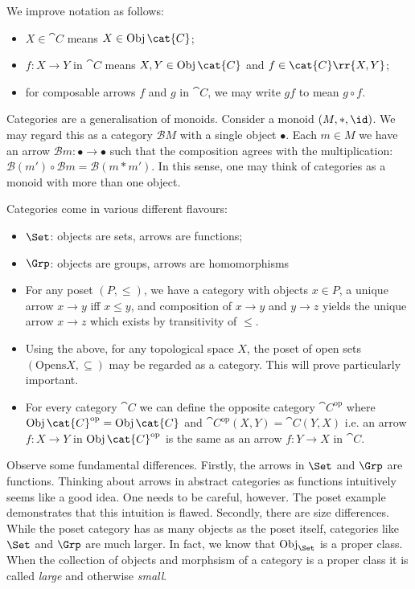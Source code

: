 \documentclass{article}
\begin{document}
\begin{notation}
  We improve notation as follows:
  \begin{itemize}
    \item $X\in\cat{C}$ means $X\in\Obj\cat{C}$;
    \item $f:X\to Y$ in $\cat{C}$ means $X,Y\in\Obj\cat{C}$ and $f\in\cat{C}\rr{X,Y}$;
    \item for composable arrows $f$ and $g$ in $\cat{C}$, we may write $gf$ to mean $g\circ f$.
  \end{itemize}
\end{notation}

Categories are a generalisation of monoids. Consider a monoid $(M,*,\id)$. We
may regard this as a category $\mathcal B M$ with a single object $\bullet$.
Each $m\in M$ we have an arrow $\mathcal B m:\bullet\to\bullet$ such that the
composition agrees with the multiplication: $\mathcal B(m')\circ\mathcal Bm =
\mathcal B(m * m')$. In this sense, one may think of categories as a monoid
with more than one object.

\begin{example}
  Categories come in various different flavours:
  \begin{itemize}
    \item $\Set$: objects are sets, arrows are functions;
    \item $\Grp$: objects are groups, arrows are homomorphisms
    \item For any poset $(P,\leq)$, we have a category with objects $x\in P$,
      a unique arrow $x\to y$ iff $x\leq y$, and composition of $x\to y$ and
      $y\to z$ yields the unique arrow $x\to z$ which exists by transitivity
      of $\leq$.
    \item Using the above, for any topological space $X$, the poset of open sets
      $(\text{Opens}X, \subseteq)$ may be regarded as a category. This will prove
      particularly important.
    \item For every category $\cat{C}$ we can define the opposite category $\cat{C}^{\text{op}}$
      where $\Obj {\cat{C}^{\text{op}}} = \Obj {\cat{C}}$ and
      $\cat{C}^{\text{op}}(X, Y) = \cat{C}(Y,X)$ i.e. an arrow $f: X \to Y$
      in $\Obj {\cat{C}^{\text{op}}}$ is the same as an arrow $f : Y \to X$
      in $\cat{C}$.
  \end{itemize}
\end{example}

Observe some fundamental differences. Firstly, the arrows in $\Set$ and $\Grp$
are functions. Thinking about arrows in abstract categories as functions
intuitively seems like a good idea. One needs to be careful, however. The poset
example demonstrates that this intuition is flawed. Secondly, there are size
differences. While the poset category has as many objects as the poset itself,
categories like $\Set$ and $\Grp$ are much larger. In fact, we know that
$\Obj_{\Set}$ is a proper class. When the collection of objects and morphsism
of a category is a proper class it is called \emph{large} and otherwise
\emph{small}.
\end{document}
